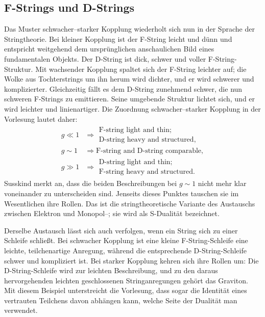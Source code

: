 \subsection{F-Strings und D-Strings}

Das Muster schwacher--starker Kopplung wiederholt sich nun in der Sprache der Stringtheorie. Bei kleiner Kopplung ist der F-String leicht und dünn und entspricht weitgehend dem ursprünglichen anschaulichen Bild eines fundamentalen Objekts. Der D-String ist dick, schwer und voller F-String-Struktur. Mit wachsender Kopplung spaltet sich der F-String leichter auf; die Wolke aus Tochterstrings um ihn herum wird dichter, und er wird schwerer und komplizierter. Gleichzeitig fällt es dem D-String zunehmend schwer, die nun schweren F-Strings zu emittieren. Seine umgebende Struktur lichtet sich, und er wird leichter und linienartiger. Die Zuordnung schwacher--starker Kopplung in der Vorlesung lautet daher:
\begin{align}
g \ll 1
&\Rightarrow
\begin{gathered}
\text{F-string light and thin;}\\
\text{D-string heavy and structured},
\end{gathered}\\
g \sim 1
&\Rightarrow
\text{F-string and D-string comparable},\\
g \gg 1
&\Rightarrow
\begin{gathered}
\text{D-string light and thin;}\\
\text{F-string heavy and structured}.
\end{gathered}
\end{align}
Susskind merkt an, dass die beiden Beschreibungen bei \(g\sim 1\) nicht mehr klar voneinander zu unterscheiden sind. Jenseits dieses Punktes tauschen sie im Wesentlichen ihre Rollen. Das ist die stringtheoretische Variante des Austauschs zwischen Elektron und Monopol--; sie wird als S-Dualität bezeichnet.

Derselbe Austausch lässt sich auch verfolgen, wenn ein String sich zu einer Schleife schließt. Bei schwacher Kopplung ist eine kleine F-String-Schleife eine leichte, teilchenartige Anregung, während die entsprechende D-String-Schleife schwer und kompliziert ist. Bei starker Kopplung kehren sich ihre Rollen um: Die D-String-Schleife wird zur leichten Beschreibung, und zu den daraus hervorgehenden leichten geschlossenen Stringanregungen gehört das Graviton. Mit diesem Beispiel unterstreicht die Vorlesung, dass sogar die Identität eines vertrauten Teilchens davon abhängen kann, welche Seite der Dualität man verwendet.

